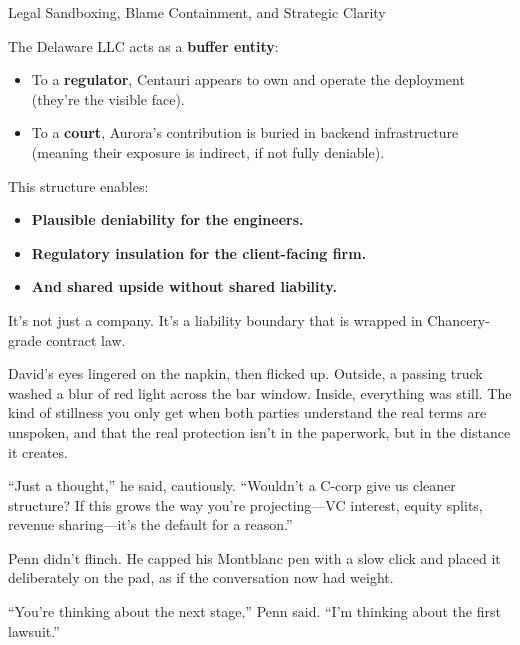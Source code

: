 \begin{TechnicalSidebar}{Legal Sandboxing, Blame Containment, and Strategic Clarity}
  \medskip
  
  The Delaware LLC acts as a \textbf{buffer entity}:

  \medskip
  
  \begin{itemize}
    \item To a \textbf{regulator}, Centauri appears to own and operate the deployment (they’re the visible face).
    \item To a \textbf{court}, Aurora’s contribution is buried in backend infrastructure (meaning their exposure 
    is indirect, if not fully deniable).
  \end{itemize}

  \medskip
  
  This structure enables:

  \medskip
  
  \begin{itemize}
  \item \textbf{Plausible deniability for the engineers.}  
  \item \textbf{Regulatory insulation for the client-facing firm.}  
  \item \textbf{And shared upside without shared liability.}
  \end{itemize}

  \medskip
  
  It’s not just a company. It’s a liability boundary that is wrapped in Chancery-grade contract law.
  
\end{TechnicalSidebar}

\medskip


David’s eyes lingered on the napkin, then flicked up. Outside, a passing truck washed a blur of red light across 
the bar window. Inside, everything was still. The kind of stillness you only get when both parties understand 
the real terms are unspoken, and that the real protection isn’t in the paperwork, but in the distance it creates.

``Just a thought,'' he said, cautiously. ``Wouldn’t a C-corp give us cleaner structure? If this grows the way you’re 
projecting---VC interest, equity splits, revenue sharing---it’s the default for a reason.''

Penn didn’t flinch. He capped his Montblanc pen with a slow click and placed it deliberately on the pad, as if the 
conversation now had weight.

``You’re thinking about the next stage,'' Penn said. ``I’m thinking about the first lawsuit.''

